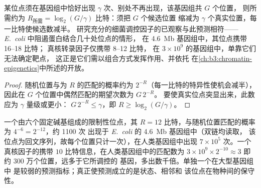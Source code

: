 \begin{proposition}[一个位点需要多少信息]\label{prop:b3:bioinformatics:bits}
某位点须在基因组中恰好出现 $\gamma$ 次、别处不再出现，该基因组共 $G$ 个位置，
则所需约为 $R_{\text{所需}} = \log_{2}(G/\gamma)$
比特：须把 $G$ 个候选位置
缩减为 $\gamma$ 个真实位置，每一比特使候选数减半。
研究充分的细菌调控因子的已观察与此预测相符——
\emph{E.~coli} 中阻遏蛋白结合几十处位点的情形，
在 \qty{4.6}{Mb} 基因组中，其位点携带 \numrange{16}{18} 比特；
真核转录因子仅携带 \numrange{8}{12} 比特，
在 $3\times 10^{9}$ 的基因组中，单靠它们无法确定靶点，
这正是它们需以组合方式发挥作用、并依托
在\cref{ch:b3:chromatin-epigenetics}中所述的开放。
\end{proposition}
\begin{proof}
随机位置与为 $R$ 的匹配的概率约为
$2^{-R}$（每一比特的特异性使机会减半），
因此在 $G$ 个位置中偶然匹配的期望次数为 $G\,2^{-R}$。
要使真实位点突显出来，此数应为 $\gamma$ 量级或更小：
$G\,2^{-R} \le \gamma$，即 $R \ge \log_{2}(G/\gamma)$。
\end{proof}

\begin{example}[期望的偶然匹配数]\label{ex:b3:bioinformatics:motif-numbers}
一个由六个固定碱基组成的限制性位点，其 $R = 12$ 比特，与随机位置匹配的概率为
$4^{-6} = 2^{-12}$，约 \num{1100} 次
出现于 \emph{E.~coli} 的 \qty{4.6}{Mb} 基因组中（双链均读取，
该位点为回文序列，故每个位置只计一次），在人类基因组中出现 $7\times 10^{5}$
次。一个真核因子的携带
$10$ 比特信息，在人类基因组中的匹配数为 $3\times 10^{9}\times 2^{-10} \approx 3$
即约 300 万个位置，远多于它所调控的
基因，多出数千倍。单独一个在大型基因组中
是较弱的预测指标；真正使预测成立的是状态、相邻和
该位点在物种间的保守性。
\end{example}

